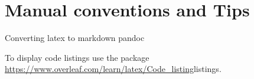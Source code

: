 \chapter{Manual conventions and Tips}

Converting latex to markdown
pandoc 

To display code listings use the package \url{https://www.overleaf.com/learn/latex/Code\_listing}{listings}.